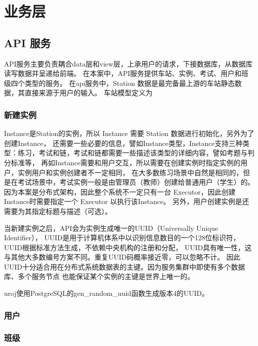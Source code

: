 \section{业务层}

\subsection{API 服务}
API服务主要负责耦合data层和view层，上承用户的请求，下接数据库，从数据库读写数据并呈递给前端。
在本案中，API服务提供车站、实例、考试、用户和班级四个类型的服务。
在api服务中，Station 数据是最完备最上游的车站静态数据，其直接来源于用户的输入。
车站模型定义为


\subsubsection{新建实例}
Instance是Station的实例，所以 Instance 需要 Station 数据进行初始化，另外为了创建Instance，
还需要一些必要的信息，譬如Instance类型，Instance支持三种类型：练习，考试和链，考试和链都需要一些描述该类型的详细内容，譬如考题与判分标准等，
再如Instance需要和用户交互，所以需要在创建实例时指定实例的用户，实例用户和实例创建者不一定相同，
在大多数练习场景中自然是相同的，但是在考试场景中，考试实例一般是由管理员（教师）创建给普通用户（学生）的。
因为本案是分布式架构，因此整个系统不一定只有一台 Executor，因此创建Instance时需要指定一个 Executor 以执行该Instance。
另外，用户创建实例是还需要为其指定标题与描述（可选）。

当新建实例之后，API会为实例生成唯一的UUID（Universally Unique Identifier），
UUID是用于计算机体系中以识别信息数目的一个128位标识符，
UUID根据标准方法生成，不依赖中央机构的注册和分配，
UUID具有唯一性，这与其他大多数编号方案不同。重复UUID码概率接近零，可以忽略不计。
因此UUID十分适合用在分布式系统数据表的主键。因为服务集群中即使有多个数据库、多个服务节点
也能保证某个实例的主键是世界上唯一的。

uroj使用PostgreSQL的gen\_random\_uuid函数生成版本4的UUID。

\subsubsection{用户}
\subsubsection{班级}

